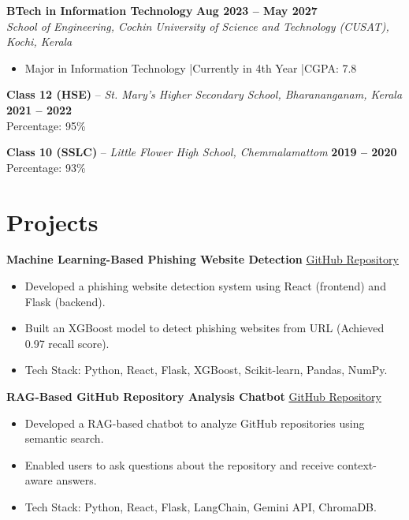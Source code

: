\documentclass[a4paper,11pt]{article}
\begin{document}
\noindent\textbf{BTech in Information Technology} \hfill \textbf{Aug 2023 -- May 2027} \\
\textit{School of Engineering, Cochin University of Science and Technology (CUSAT), Kochi, Kerala}
\begin{itemize}
\item Major in Information Technology \quad|\quad Currently in 4th Year \quad|\quad CGPA: 7.8
\end{itemize}

\vspace{3pt}
\noindent\textbf{Class 12 (HSE)} -- \textit{St. Mary's Higher Secondary School, Bharananganam, Kerala} \hfill \textbf{2021 -- 2022} \\
\small Percentage: 95\%

\vspace{3pt}
\noindent\textbf{Class 10 (SSLC)} -- \textit{Little Flower High School, Chemmalamattom} \hfill \textbf{2019 -- 2020} \\
\small Percentage: 93\%

\section*{Projects}

\vspace{4pt}
\noindent\textbf{Machine Learning-Based Phishing Website Detection} \hfill \href{https://github.com/dhanush35-lab/Phishing-Detector}{GitHub Repository}
\begin{itemize}
\item Developed a phishing website detection system using React (frontend) and Flask (backend).
\item Built an XGBoost model to detect phishing websites from URL (Achieved 0.97 recall score).
\item Tech Stack: Python, React, Flask, XGBoost, Scikit-learn, Pandas, NumPy.
\end{itemize}

\vspace{4pt}
\noindent\textbf{RAG-Based GitHub Repository Analysis Chatbot} \hfill \href{https://github.com/dhanush35-lab/Repo-IQ}{GitHub Repository}
\begin{itemize}
\item Developed a RAG-based chatbot to analyze GitHub repositories using semantic search.
\item Enabled users to ask questions about the repository and receive context-aware answers.
\item Tech Stack: Python, React, Flask, LangChain, Gemini API, ChromaDB.
\end{itemize}
\end{document}
